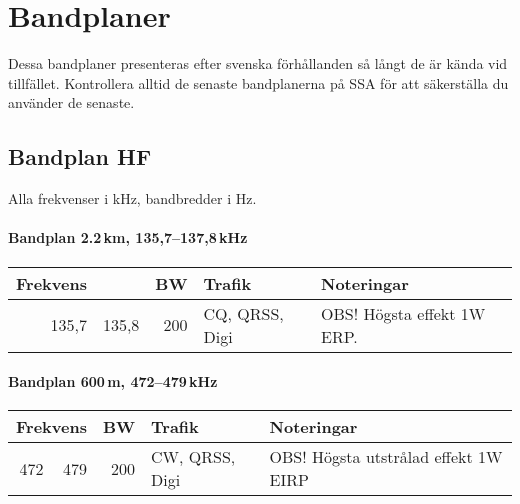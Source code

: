\onecolumn

\chapter{Bandplaner}
\label{bandplaner2}

\noindent Dessa bandplaner presenteras efter svenska förhållanden så långt de är kända vid tillfället. Kontrollera alltid de senaste bandplanerna på SSA för att säkerställa du använder de senaste.

\section{Bandplan HF}

Alla frekvenser i kHz, bandbredder i Hz.

\subsubsection{Bandplan 2.2\,km, 135,7--137,8\,kHz}
\begin{tabular}{rrrll}
\textbf{Frekvens} &  & \textbf{BW} & \textbf{Trafik} & \textbf{Noteringar} \\ \hline
135,7 & 135,8 & 200 & CQ, QRSS, Digi & OBS! Högsta effekt 1W ERP. \\ \hline
\end{tabular}

\subsubsection{Bandplan 600\,m, 472--479\,kHz}
\begin{tabular}{rrrll}
\multicolumn{2}{c}{\textbf{Frekvens}} & \textbf{BW} & \textbf{Trafik} & \textbf{Noteringar} \\ \hline
472 & 479 & 200 & CW, QRSS, Digi & OBS! Högsta utstrålad effekt 1W EIRP \\ \hline
\end{tabular}

